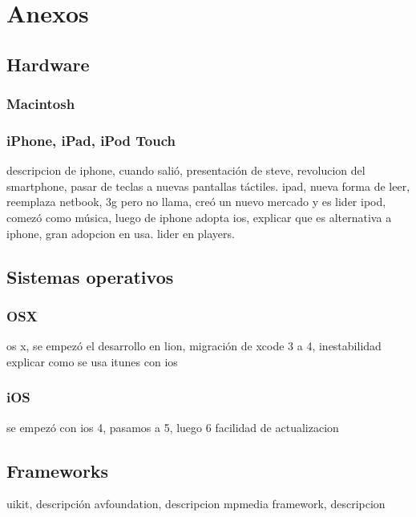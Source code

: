 \chapter{Anexos}
	\section{Hardware}
		\subsection{Macintosh}

		\subsection{iPhone, iPad, iPod Touch}
		descripcion de iphone, cuando salió, presentación de steve, revolucion del smartphone, pasar de teclas a nuevas pantallas táctiles.
		ipad, nueva forma de leer, reemplaza netbook, 3g pero no llama, creó un nuevo mercado y es lider
		ipod, comezó como música, luego de iphone adopta ios, explicar que es alternativa a iphone, gran adopcion en usa.  lider en players.
	\section{Sistemas operativos}
		\subsection{OSX}
		os x, se empezó el desarrollo en lion, migración de xcode 3 a 4, inestabilidad
		explicar como se usa  itunes con ios
		\subsection{iOS}
		se empezó con ios 4, pasamos a 5, luego 6		
		facilidad de actualizacion
	\section{Frameworks}
	uikit, descripción 
	avfoundation, descripcion
	mpmedia framework, descripcion
	
